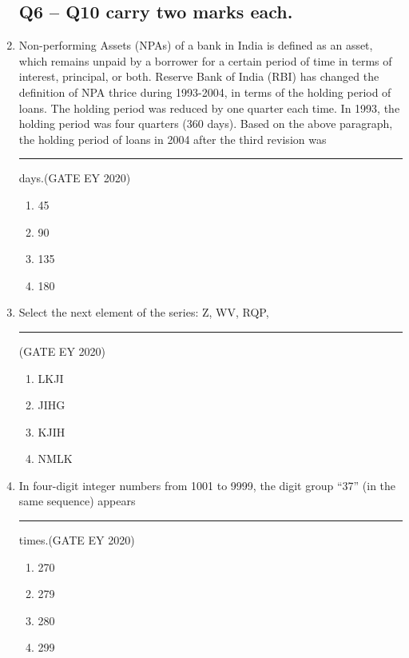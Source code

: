 \begin{enumerate}
\subsection*{Q6 -- Q10 carry two marks each.}



    \item Non-performing Assets (NPAs) of a bank in India is defined as an asset, which remains unpaid by a borrower for a certain period of time in terms of interest, principal, or both. Reserve Bank of India (RBI) has changed the definition of NPA thrice during 1993-2004, in terms of the holding period of loans. The holding period was reduced by one quarter each time. In 1993, the holding period was four quarters (360 days).
    Based on the above paragraph, the holding period of loans in 2004 after the third revision was \rule{2cm}{0.15mm} days.\hfill {(GATE EY 2020)}

\begin{enumerate}
    \item 45
    \item 90
    \item 135
    \item 180
\end{enumerate}

\item Select the next element of the series: Z, WV, RQP, \rule{2cm}{0.15mm}\hfill {(GATE EY 2020)}
\begin{enumerate}
    \item LKJI
    \item JIHG
    \item KJIH
    \item NMLK
\end{enumerate}

\item In four-digit integer numbers from 1001 to 9999, the digit group “37” (in the same sequence) appears \rule{2cm}{0.15mm} times.\hfill {(GATE EY 2020)}
\begin{enumerate}
    \item 270
    \item 279
    \item 280
    \item 299
\end{enumerate}



\end{enumerate}
